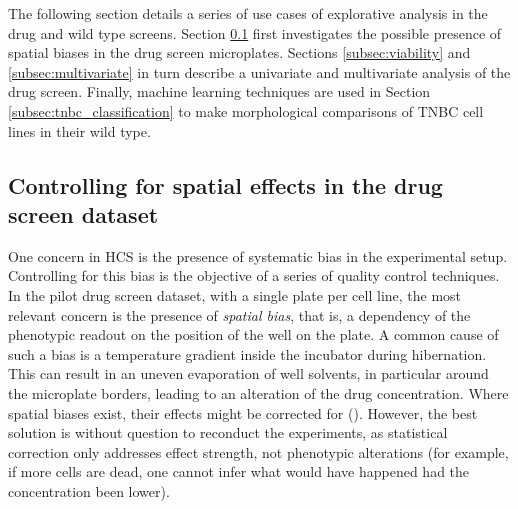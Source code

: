 The following section details a series of use cases of explorative analysis in the drug and wild type screens. Section \ref{subsec:spatial_effects} first investigates the possible presence of spatial biases in the drug screen microplates. Sections \ref{subsec:viability} and \ref{subsec:multivariate} in turn describe a univariate and multivariate analysis of the drug screen. Finally, machine learning techniques are used in Section \ref{subsec:tnbc_classification} to make morphological comparisons of TNBC cell lines in their wild type.

\subsection{Controlling for spatial effects in the drug screen dataset}
\label{subsec:spatial_effects}
One concern in HCS is the presence of systematic bias in the experimental setup. Controlling for this bias is the objective of a series of quality control techniques. In the pilot drug screen dataset, with a single plate per cell line, the most relevant concern is the presence of \emph{spatial bias}, that is, a dependency of the phenotypic readout on the position of the well on the plate. A common cause of such a bias is a temperature gradient inside the incubator during hibernation. This can result in an uneven evaporation of well solvents, in particular around the microplate borders, leading to an alteration of the drug concentration. Where spatial biases exist, their effects might be corrected for (\cite{Caraus2015, Ljosa2009}). However, the best solution is without question to reconduct the experiments, as statistical correction only addresses effect strength, not phenotypic alterations (for example, if more cells are dead, one cannot infer what would have happened had the concentration been lower).


